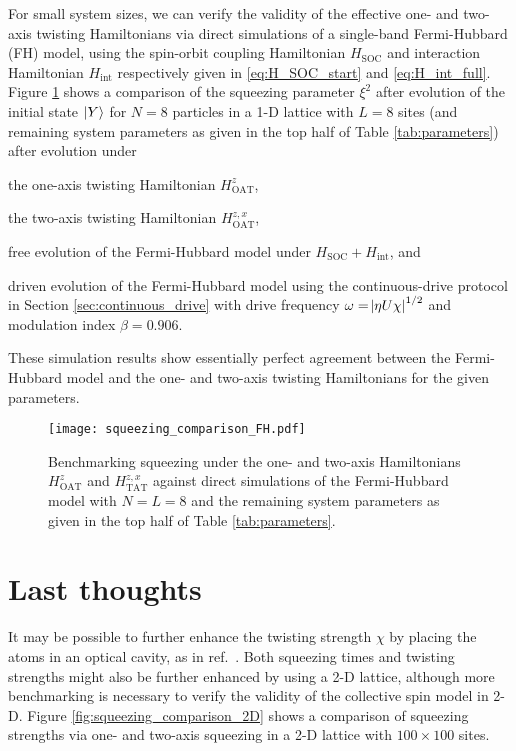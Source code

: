 \documentclass[aps,notitlepage,nofootinbib,11pt]{revtex4-1}
\renewcommand{\t}{\text} %
\newcommand{\1}{\mathds{1}}
\begin{document}
For small system sizes, we can verify the validity of the effective
one- and two-axis twisting Hamiltonians via direct simulations of a
single-band Fermi-Hubbard (FH) model, using the spin-orbit coupling
Hamiltonian $H_{\t{SOC}}$ and interaction Hamiltonian $H_{\t{int}}$
respectively given in \eqref{eq:H_SOC_start} and
\eqref{eq:H_int_full}.  Figure \ref{fig:squeezing_comparison_FH} shows
a comparison of the squeezing parameter $\xi^2$ after evolution of the
initial state $\ket{Y}$ for $N=8$ particles in a 1-D lattice with
$L=8$ sites (and remaining system parameters as given in the top half
of Table \ref{tab:parameters}) after evolution under
\begin{enumerate*}[label=(\roman*)]
\item the one-axis twisting Hamiltonian $H_{\t{OAT}}^z$,
\item the two-axis twisting Hamiltonian $H_{\t{OAT}}^{z,x}$,
\item free evolution of the Fermi-Hubbard model under
  $H_{\t{SOC}}+H_{\t{int}}$, and
\item driven evolution of the Fermi-Hubbard model using the
  continuous-drive protocol in Section \ref{sec:continuous_drive} with
  drive frequency $\omega=\abs{\eta U\chi}^{1/2}$ and modulation index
  $\beta=0.906$.
\end{enumerate*}
These simulation results show essentially perfect agreement between
the Fermi-Hubbard model and the one- and two-axis twisting
Hamiltonians for the given parameters.

\begin{figure}
  \centering
  \texttt{[image: squeezing\_comparison\_FH.pdf]}
  \caption{Benchmarking squeezing under the one- and two-axis
    Hamiltonians $H_{\t{OAT}}^z$ and $H_{\t{TAT}}^{z,x}$ against
    direct simulations of the Fermi-Hubbard model with $N=L=8$ and the
    remaining system parameters as given in the top half of Table
    \ref{tab:parameters}.}
  \label{fig:squeezing_comparison_FH}
\end{figure}


\section{Last thoughts}

It may be possible to further enhance the twisting strength $\chi$ by
placing the atoms in an optical cavity, as in
ref.~\cite{hu2017vacuum}.  Both squeezing times and twisting strengths
might also be further enhanced by using a 2-D lattice, although more
benchmarking is necessary to verify the validity of the collective
spin model in 2-D.  Figure \ref{fig:squeezing_comparison_2D} shows a
comparison of squeezing strengths via one- and two-axis squeezing in a
2-D lattice with $100\times100$ sites.
\end{document}
